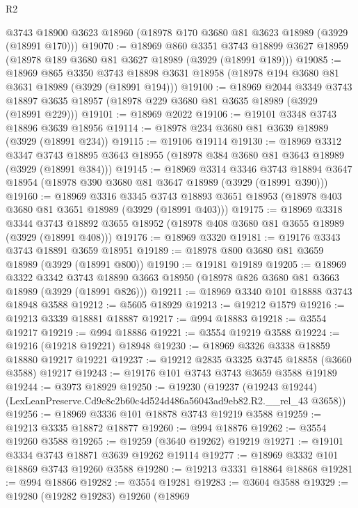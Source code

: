 \begin{lexlean}{R2}
\begin{coremodule}
    @3743
    @18900
    @3623
    @18960
    (@18978 @170 @3680 @81 @3623 @18989 (@3929 (@18991 @170)))
@19070 := @18969
    @860
    @3351
    @3743
    @18899
    @3627
    @18959
    (@18978 @189 @3680 @81 @3627 @18989 (@3929 (@18991 @189)))
@19085 := @18969
    @865
    @3350
    @3743
    @18898
    @3631
    @18958
    (@18978 @194 @3680 @81 @3631 @18989 (@3929 (@18991 @194)))
@19100 := @18969
    @2044
    @3349
    @3743
    @18897
    @3635
    @18957
    (@18978 @229 @3680 @81 @3635 @18989 (@3929 (@18991 @229)))
@19101 := @18969 @2022
@19106 := @19101 @3348 @3743 @18896 @3639 @18956
@19114 := @18978 @234 @3680 @81 @3639 @18989 (@3929 (@18991 @234))
@19115 := @19106 @19114
@19130 := @18969
    @3312
    @3347
    @3743
    @18895
    @3643
    @18955
    (@18978 @384 @3680 @81 @3643 @18989 (@3929 (@18991 @384)))
@19145 := @18969
    @3314
    @3346
    @3743
    @18894
    @3647
    @18954
    (@18978 @390 @3680 @81 @3647 @18989 (@3929 (@18991 @390)))
@19160 := @18969
    @3316
    @3345
    @3743
    @18893
    @3651
    @18953
    (@18978 @403 @3680 @81 @3651 @18989 (@3929 (@18991 @403)))
@19175 := @18969
    @3318
    @3344
    @3743
    @18892
    @3655
    @18952
    (@18978 @408 @3680 @81 @3655 @18989 (@3929 (@18991 @408)))
@19176 := @18969 @3320
@19181 := @19176 @3343 @3743 @18891 @3659 @18951
@19189 := @18978 @800 @3680 @81 @3659 @18989 (@3929 (@18991 @800))
@19190 := @19181 @19189
@19205 := @18969
    @3322
    @3342
    @3743
    @18890
    @3663
    @18950
    (@18978 @826 @3680 @81 @3663 @18989 (@3929 (@18991 @826)))
@19211 := @18969 @3340 @101 @18888 @3743 @18948 @3588
@19212 := @5605 @18929
@19213 := @19212 @1579
@19216 := @19213 @3339 @18881 @18887
@19217 := @994 @18883
@19218 := @3554 @19217
@19219 := @994 @18886
@19221 := @3554 @19219 @3588
@19224 := @19216 (@19218 @19221) @18948
@19230 := @18969 @3326 @3338 @18859 @18880 @19217 @19221
@19237 := @19212 @2835 @3325 @3745 @18858 (@3660 @3588) @19217
@19243 := @19176 @101 @3743 @3743 @3659 @3588 @19189
@19244 := @3973 @18929
@19250 := @19230
    (@19237 (@19243 @19244) (LexLeanPreserve.Cd9c8c2b60c4d524d486a56043ad9eb82.R2.__rel_43 @3658))
@19256 := @18969 @3336 @101 @18878 @3743 @19219 @3588
@19259 := @19213 @3335 @18872 @18877
@19260 := @994 @18876
@19262 := @3554 @19260 @3588
@19265 := @19259 (@3640 @19262) @19219
@19271 := @19101 @3334 @3743 @18871 @3639 @19262 @19114
@19277 := @18969 @3332 @101 @18869 @3743 @19260 @3588
@19280 := @19213 @3331 @18864 @18868
@19281 := @994 @18866
@19282 := @3554 @19281
@19283 := @3604 @3588
@19329 := @19280
    (@19282 @19283)
    @19260
    (@18969

\end{coremodule}
\end{lexlean}
